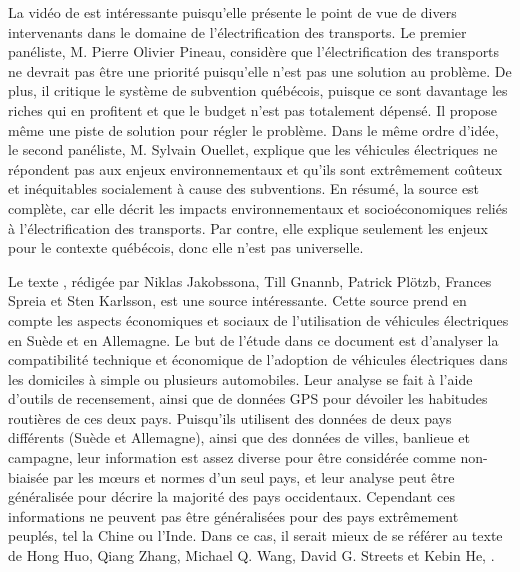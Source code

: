 La vidéo de  est intéressante puisqu’elle présente le point de vue de divers intervenants dans le domaine de l’électrification des transports. Le premier panéliste, M. Pierre Olivier Pineau, considère que l’électrification des transports ne devrait pas être une priorité puisqu’elle n’est pas une solution au problème. De plus, il critique le système de subvention québécois, puisque ce sont davantage les riches qui en profitent et que le budget n’est pas totalement dépensé. Il propose même une piste de solution pour régler le problème. Dans le même ordre d’idée, le second panéliste, M. Sylvain Ouellet, explique que les véhicules électriques ne répondent pas aux enjeux environnementaux et qu’ils sont extrêmement coûteux et inéquitables socialement à cause des subventions. En résumé, la source est complète, car elle décrit les impacts environnementaux et socioéconomiques reliés à l’électrification des transports. Par contre, elle explique seulement les enjeux pour le contexte québécois, donc elle n’est pas universelle.

Le texte , rédigée par Niklas Jakobssona, Till Gnannb, Patrick Plötzb, Frances Spreia et Sten Karlsson, est une source intéressante. Cette source prend en compte les aspects économiques et sociaux de l'utilisation de véhicules électriques en Suède et en Allemagne. Le but de l'étude dans ce document est d'analyser la compatibilité technique et économique de l'adoption de véhicules électriques dans les domiciles à simple ou plusieurs automobiles. Leur analyse se fait à l'aide d'outils de recensement, ainsi que de données GPS pour dévoiler les habitudes routières de ces deux pays. Puisqu'ils utilisent des données de deux pays différents (Suède et Allemagne), ainsi que des données de villes, banlieue et campagne, leur information est assez diverse pour être considérée comme non-biaisée par les m\oe urs et normes d'un seul pays, et leur analyse peut être généralisée pour décrire la majorité des pays occidentaux. Cependant ces informations ne peuvent pas être généralisées pour des pays extrêmement peuplés, tel la Chine ou l'Inde. Dans ce cas, il serait mieux de se référer au texte de Hong Huo, Qiang Zhang, Michael Q. Wang, David G. Streets et Kebin He, .


